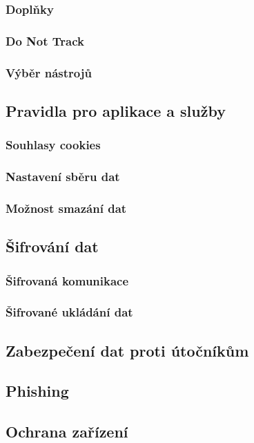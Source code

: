 \subsubsection*{Doplňky}
\subsubsection*{Do Not Track}
\subsubsection*{Výběr nástrojů}

\subsection{Pravidla pro aplikace a služby}
\subsubsection*{Souhlasy cookies}
\subsubsection*{Nastavení sběru dat}
\subsubsection*{Možnost smazání dat}

\subsection{Šifrování dat}
\subsubsection*{Šifrovaná komunikace}
\subsubsection*{Šifrované ukládání dat}

\subsection*{Zabezpečení dat proti útočníkům}
\subsection{Phishing}

\subsection{Ochrana zařízení}

